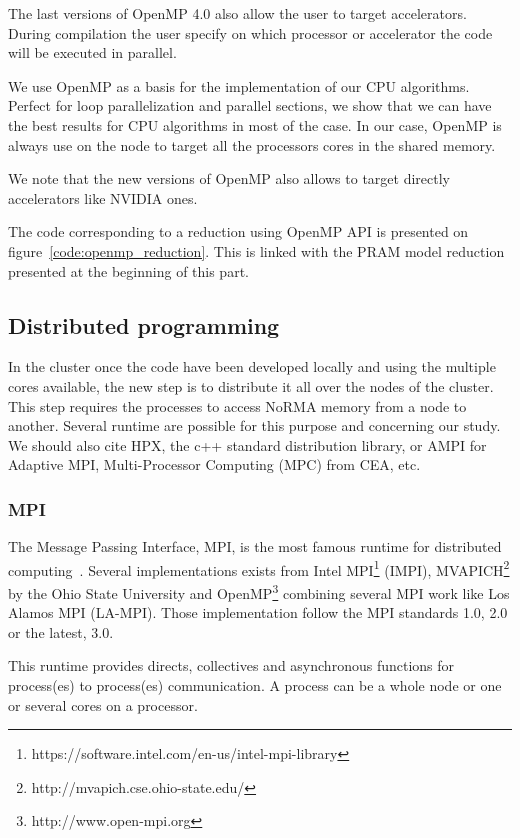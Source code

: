 The last versions of OpenMP 4.0 also allow the user to target accelerators. 
During compilation the user specify on which processor or accelerator the code will be executed in parallel. 

We use OpenMP as a basis for the implementation of our CPU algorithms. 
Perfect for loop parallelization and parallel sections, we show that we can have the best results for CPU algorithms in most of the case. 
In our case, OpenMP is always use on the node to target all the processors cores in the shared memory. 

We note that the new versions of OpenMP also allows to target directly accelerators like NVIDIA ones. 

The code corresponding to a reduction using OpenMP API is presented on figure~\ref{code:openmp_reduction}.
This is linked with the PRAM model reduction presented at the beginning of this part. 

\subsection{Distributed programming}
In the cluster once the code have been developed locally and using the multiple cores available, the new step is to distribute it all over the nodes of the cluster. 
This step requires the processes to access NoRMA memory from a node to another. 
Several runtime are possible for this purpose and concerning our study. 
We should also cite HPX, the c++ standard distribution library, or AMPI for Adaptive MPI, Multi-Processor Computing (MPC) from CEA, etc.

\subsubsection{MPI}
The Message Passing Interface, MPI, is the most famous runtime for distributed computing~\cite{gropp2014using,gropp2015using}.
Several implementations exists from Intel MPI\footnote{https://software.intel.com/en-us/intel-mpi-library} (IMPI), MVAPICH\footnote{http://mvapich.cse.ohio-state.edu/} by the Ohio State University and OpenMP\footnote{http://www.open-mpi.org} combining several MPI work like Los Alamos MPI (LA-MPI).
Those implementation follow the MPI standards 1.0, 2.0 or the latest, 3.0. 

This runtime provides directs, collectives and asynchronous functions for process(es) to process(es) communication.
A process can be a whole node or one or several cores on a processor.  

